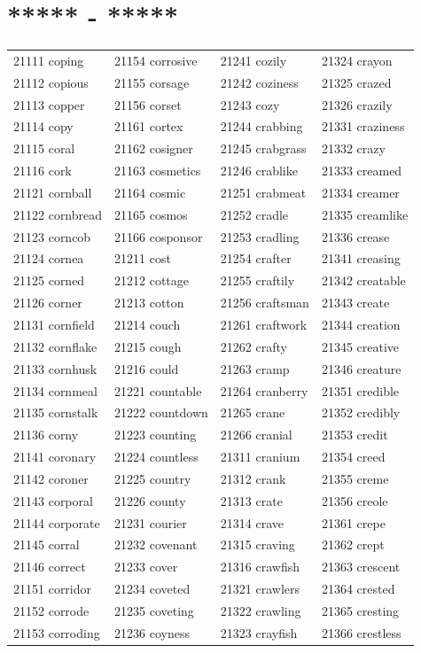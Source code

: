 \documentclass[10pt, oneside]{book}
\begin{document}
\begin{table}
	\centering
	\section*{***** - *****}
	\begin{tabular}{l l l l}
21111 coping &21154 corrosive &21241 cozily &21324 crayon\\
21112 copious &21155 corsage &21242 coziness &21325 crazed\\
21113 copper &21156 corset &21243 cozy &21326 crazily\\
21114 copy &21161 cortex &21244 crabbing &21331 craziness\\
21115 coral &21162 cosigner &21245 crabgrass &21332 crazy\\
21116 cork &21163 cosmetics &21246 crablike &21333 creamed\\
21121 cornball &21164 cosmic &21251 crabmeat &21334 creamer\\
21122 cornbread &21165 cosmos &21252 cradle &21335 creamlike\\
21123 corncob &21166 cosponsor &21253 cradling &21336 crease\\
21124 cornea &21211 cost &21254 crafter &21341 creasing\\
21125 corned &21212 cottage &21255 craftily &21342 creatable\\
21126 corner &21213 cotton &21256 craftsman &21343 create\\
21131 cornfield &21214 couch &21261 craftwork &21344 creation\\
21132 cornflake &21215 cough &21262 crafty &21345 creative\\
21133 cornhusk &21216 could &21263 cramp &21346 creature\\
21134 cornmeal &21221 countable &21264 cranberry &21351 credible\\
21135 cornstalk &21222 countdown &21265 crane &21352 credibly\\
21136 corny &21223 counting &21266 cranial &21353 credit\\
21141 coronary &21224 countless &21311 cranium &21354 creed\\
21142 coroner &21225 country &21312 crank &21355 creme\\
21143 corporal &21226 county &21313 crate &21356 creole\\
21144 corporate &21231 courier &21314 crave &21361 crepe\\
21145 corral &21232 covenant &21315 craving &21362 crept\\
21146 correct &21233 cover &21316 crawfish &21363 crescent\\
21151 corridor &21234 coveted &21321 crawlers &21364 crested\\
21152 corrode &21235 coveting &21322 crawling &21365 cresting\\
21153 corroding &21236 coyness &21323 crayfish &21366 crestless\\
	\end{tabular}
 \end{table}
\end{document}
